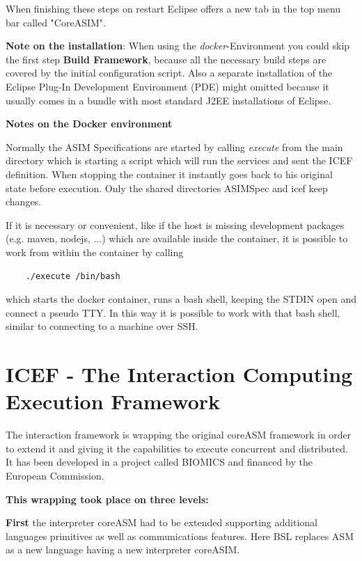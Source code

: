 When finishing these steps on restart Eclipse offers a new tab in the top menu bar called "CoreASIM".

\textbf{Note on the installation}: When using the \textit{docker}-Environment you could skip the first step \textbf{Build Framework}, because all the necessary build steps are covered by the initial configuration script. Also a separate installation of the Eclipse Plug-In Development Environment (PDE) might omitted because it usually comes in a bundle with most standard J2EE installations of Eclipse.

\textbf{Notes on the Docker environment}
\label{sec_inner:note-docker}

Normally the ASIM Specifications are started by calling \textit{execute} from the main directory which is starting a script which will run the services and sent the ICEF definition. When stopping the container it instantly goes back to his original state before execution. Only the shared directories ASIMSpec and icef keep changes.

If it is necessary or convenient, like if the host is missing development packages (e.g. maven, nodejs, ...) which are available inside the container, it is possible to work from within the container by calling

\begin{lstlisting}
	./execute /bin/bash
\end{lstlisting}

which starts the docker container, runs a bash shell, keeping the STDIN open and connect a pseudo TTY. In this way it is possible to work with that bash shell, similar to connecting to a machine over SSH.

\section{ICEF - The Interaction Computing Execution Framework}
\label{sec:icef-intro}

The interaction framework is wrapping the original coreASM framework in order to extend it and giving it the capabilities to execute concurrent and distributed. It has been developed in a project called BIOMICS and financed by the European Commission.

\textbf{This wrapping took place on three levels:}

\textbf{First} the interpreter coreASM had to be extended supporting additional languages primitives as well as communications features. Here BSL replaces ASM as a new language having a new interpreter coreASIM.

